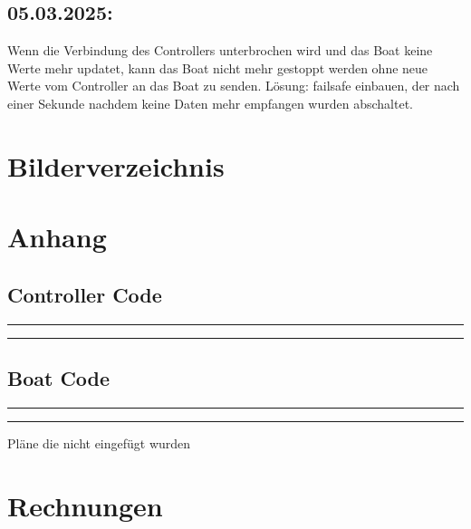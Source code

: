 \documentclass[a4paper,12pt]{article}
\begin{document}
\subsection{05.03.2025:} Wenn die Verbindung des Controllers unterbrochen wird und das Boat keine Werte mehr updatet, kann das Boat nicht mehr gestoppt werden ohne neue Werte vom Controller an das Boat zu senden. Lösung: failsafe einbauen, der nach einer Sekunde nachdem keine Daten mehr empfangen wurden abschaltet. 



\newpage



\medskip


\newpage
\section{Bilderverzeichnis}
\listoffigures

\newpage

\newpage
\section*{Anhang}

\subsection{Controller Code}

\noindent\rule{\linewidth}{0.4pt}  %

\noindent\rule{\linewidth}{0.4pt}  %


\newpage
\subsection{Boat Code}
\noindent\rule{\linewidth}{0.4pt}  %

\noindent\rule{\linewidth}{0.4pt}  %


Pläne die nicht eingefügt wurden

\newpage

\section*{Rechnungen}
\end{document}

